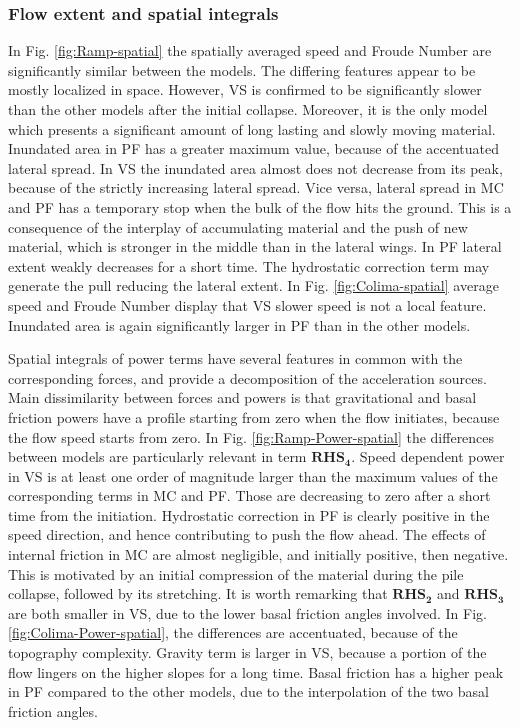 \documentclass{article}
\begin{document}
\subsubsection{Flow extent and spatial integrals}
In Fig. \ref{fig:Ramp-spatial} the spatially averaged speed and Froude Number are significantly similar between the models. The differing features appear to be mostly localized in space. However, VS is confirmed to be significantly slower than the other models after the initial collapse. Moreover, it is the only model which presents a significant amount of long lasting and slowly moving material. Inundated area in PF has a greater maximum value, because of the accentuated lateral spread. In VS the inundated area almost does not decrease from its peak, because of the strictly increasing lateral spread. Vice versa, lateral spread in MC and PF has a temporary stop when the bulk of the flow hits the ground. This is a consequence of the interplay of accumulating material and the push of new material, which is stronger in the middle than in the lateral wings. In PF lateral extent weakly decreases for a short time. The hydrostatic correction term may generate the pull reducing the lateral extent. In Fig. \ref{fig:Colima-spatial} average speed and Froude Number display that VS slower speed is not a local feature. Inundated area is again significantly larger in PF than in the other models.

Spatial integrals of power terms have several features in common with the corresponding forces, and provide a decomposition of the acceleration sources. Main dissimilarity between forces and powers is that gravitational and basal friction powers have a profile starting from zero when the flow initiates, because the flow speed starts from zero. In Fig. \ref{fig:Ramp-Power-spatial} the differences between models are particularly relevant in term  $\boldsymbol{RHS_4}$. Speed dependent power in VS is at least one order of magnitude larger than the maximum values of the corresponding terms in MC and PF. Those are decreasing to zero after a short time from the initiation. Hydrostatic correction in PF is clearly positive in the speed direction, and hence contributing to push the flow ahead. The effects of internal friction in MC are almost negligible, and initially positive, then negative. This is motivated by an initial compression of the material during the pile collapse, followed by its stretching. It is worth remarking that $\boldsymbol{RHS_2}$ and $\boldsymbol{RHS_3}$ are both smaller in VS, due to the lower basal friction angles involved. In Fig. \ref{fig:Colima-Power-spatial}, the differences are accentuated, because of the topography complexity. Gravity term is larger in VS, because a portion of the flow lingers on the higher slopes for a long time. Basal friction has a higher peak in PF compared to the other models, due to the interpolation of the two basal friction angles.
\end{document}
